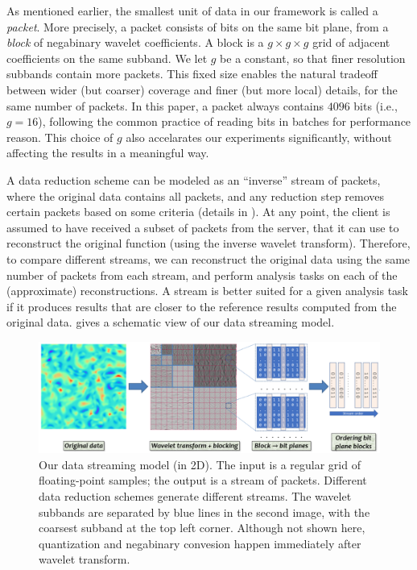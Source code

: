 As mentioned earlier, the smallest unit of data in our framework is called a
\emph{packet}.  More precisely, a packet consists of bits on the same bit
plane, from a \emph{block} of negabinary wavelet coefficients. A block is a
$g\times g\times g$ grid of adjacent coefficients on the same subband. We let
$g$ be a constant, so that finer resolution subbands contain more packets. This fixed size
enables the natural tradeoff between wider (but coarser) coverage and finer
(but more local) details, for the same number of packets. In this paper, a
packet always contains $4096$ bits (i.e., $g=16$), following the common
practice of reading bits in batches for performance reason. This choice of $g$
also accelarates our experiments significantly, without affecting the results
in a meaningful way. 

A data reduction scheme can be modeled as an ``inverse'' stream of packets,
where the original data contains all packets, and any reduction step removes
certain packets based on some criteria (details in
).    At any point, the client is assumed to have received a subset of
packets from the server, that it can use to reconstruct the original function
(using the inverse wavelet transform). Therefore, to compare different streams,
we can reconstruct the original data using the same number of packets from
each stream, and perform analysis tasks on each of the (approximate) reconstructions.
A stream is better suited for a given analysis task if it produces results that
are closer to  the reference results
computed from the original data.  gives a schematic view of
our data streaming model.

\begin{figure}[h]
\centering
\includegraphics[width=\linewidth]{img/pipeline.png}
\caption{Our data streaming model (in 2D). The input is a regular grid of
floating-point samples; the output is a stream of packets. Different data
reduction schemes generate different streams.  The wavelet subbands are
separated by blue lines in the second image, with the coarsest subband at the
top left corner. Although not shown here, quantization and negabinary
convesion happen immediately after wavelet transform. }\label{fig:pipeline}
\end{figure}

